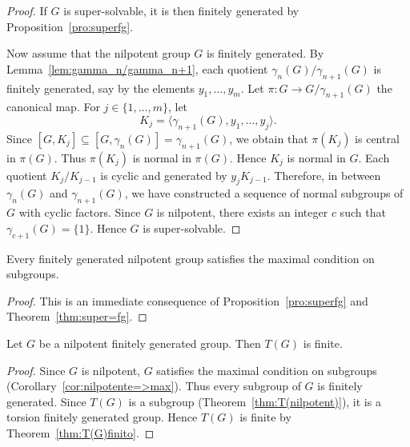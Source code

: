 \begin{proof}
    If $G$ is super-solvable, it is then finitely generated by 
    Proposition~\ref{pro:superfg}.  
    
    Now assume that the nilpotent group $G$ is finitely generated. By Lemma~\ref{lem:gamma_n/gamma_n+1}, 
    each quotient $\gamma_{n}(G)/\gamma_{n+1}(G)$ is finitely generated, say by 
    the elements $y_1,\dots,y_m$. Let $\pi\colon G\to G/\gamma_{n+1}(G)$ the canonical map. 
    For $j\in\{1,\dots,m\}$, let 
    \[
    K_j=\langle \gamma_{n+1}(G),y_1,\dots,y_j\rangle.
    \]
    Since $[G,K_j]\subseteq [G,\gamma_n(G)]=\gamma_{n+1}(G)$, 
    we obtain that $\pi(K_j)$ is central in $\pi(G)$. Thus $\pi(K_j)$ is normal
    in $\pi(G)$. Hence $K_j$ is normal in $G$. Each quotient $K_j/K_{j-1}$
    is cyclic and generated by $y_jK_{j-1}$. Therefore, in between $\gamma_n(G)$ and 
    $\gamma_{n+1}(G)$, we have constructed a sequence of normal subgroups of $G$ 
    with cyclic factors. Since $G$ is nilpotent, there exists an integer $c$ such that 
    $\gamma_{c+1}(G)=\{1\}$. Hence $G$ is super-solvable. 
\end{proof}

\begin{corollary}
	\label{cor:nilpotente=>max}
    Every finitely generated nilpotent group satisfies the maximal condition on subgroups. 
\end{corollary}

\begin{proof}
    This is an immediate consequence of Proposition~\ref{pro:superfg} and 
    Theorem~\ref{thm:super=fg}.  
\end{proof}

\begin{theorem}
    Let $G$ be a nilpotent finitely generated group. Then $T(G)$ is finite. 
\end{theorem}

\begin{proof}
    Since $G$ is nilpotent, $G$ satisfies the maximal condition on subgroups 
    (Corollary~\ref{cor:nilpotente=>max}). Thus 
	every subgroup of $G$ is finitely generated. Since 
    $T(G)$ is a subgroup (Theorem~\ref{thm:T(nilpotent)}), it is a torsion finitely generated group. 
	Hence $T(G)$ is finite by Theorem~\ref{thm:T(G)finito}.
\end{proof}



